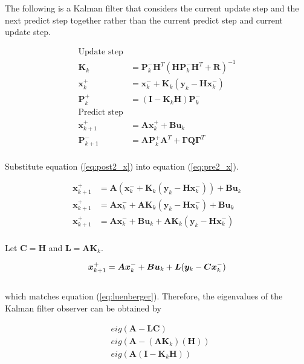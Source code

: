 \documentclass[10pt,conference,compsoc]{IEEEtran}
\newcommand{\mtx}[1] {\bm #1}
\begin{document}
\noindent The following is a Kalman filter that considers the current update
step and the next predict step together rather than the current predict step and
current update step.

\begin{align}
  \text{Update step} \nonumber \\
  \mtx{K}_k &= \mtx{P}_k^- \mtx{H}^T (\mtx{H}\mtx{P}_k^- \mtx{H}^T +
    \mtx{R})^{-1} \\
  \mtx{x}_k^+ &= \mtx{x}_k^- + \mtx{K}_k (\mtx{y}_k - \mtx{H} \mtx{x}_k^-)
    \label{eq:post2_x} \\
  \mtx{P}_k^+ &= (\mtx{I} - \mtx{K}_k\mtx{H})\mtx{P}_k^- \\
  \text{Predict step} \nonumber \\
  \mtx{x}_{k+1}^+ &= \mtx{A} \mtx{x}_k^+ + \mtx{B} \mtx{u}_k
    \label{eq:pre2_x} \\
  \mtx{P}_{k+1}^- &= \mtx{A} \mtx{P}_k^+ \mtx{A}^T +
    \mtx{\Gamma}\mtx{Q}\mtx{\Gamma}^T
\end{align}
\\
\noindent Substitute equation (\ref{eq:post2_x}) into equation
(\ref{eq:pre2_x}).

\begin{align*}
  \mtx{x}_{k+1}^+ &= \mtx{A} (\mtx{x}_k^- +
    \mtx{K}_k (\mtx{y}_k - \mtx{H} \mtx{x}_k^-)) + \mtx{B} \mtx{u}_k \\
  \mtx{x}_{k+1}^+ &= \mtx{A} \mtx{x}_k^- +
    \mtx{A} \mtx{K}_k (\mtx{y}_k - \mtx{H} \mtx{x}_k^-) + \mtx{B} \mtx{u}_k \\
  \mtx{x}_{k+1}^+ &= \mtx{A} \mtx{x}_k^- + \mtx{B} \mtx{u}_k +
    \mtx{A} \mtx{K}_k (\mtx{y}_k - \mtx{H} \mtx{x}_k^-) \\
\end{align*}

\noindent Let $\mtx{C} = \mtx{H}$ and $\mtx{L} = \mtx{A} \mtx{K}_k$.

\begin{equation} \label{eq:kalman_leunberger}
  \mtx{x}_{k+1}^+ = \mtx{A} \mtx{x}_k^- + \mtx{B} \mtx{u}_k +
    \mtx{L} (\mtx{y}_k - \mtx{C} \mtx{x}_k^-) \\
\end{equation}
\\
\noindent which matches equation (\ref{eq:luenberger}). Therefore,
the eigenvalues of the Kalman filter observer can be obtained by

\begin{align}
  &eig(\mtx{A} - \mtx{L}\mtx{C}) \nonumber \\
  &eig(\mtx{A} - (\mtx{A}\mtx{K}_k)(\mtx{H})) \nonumber \\
  &eig(\mtx{A}(\mtx{I} - \mtx{K}_k\mtx{H}))
\end{align}
\end{document}
